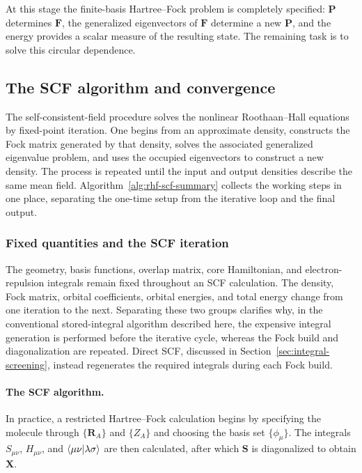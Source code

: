 \documentclass[11pt,a4paper,titlepage]{article}
\numberwithin{equation}{section}
\newcommand{\bF}{\boldsymbol{F}}
\newcommand{\bP}{\boldsymbol{P}}
\newcommand{\bR}{\boldsymbol{R}}
\newcommand{\bS}{\boldsymbol{S}}
\newcommand{\bX}{\boldsymbol{X}}
\begin{document}
At this stage the finite-basis Hartree--Fock problem is completely specified:
$\bP$ determines $\bF$, the generalized eigenvectors of $\bF$ determine a new
$\bP$, and the energy provides a scalar measure of the resulting state. The
remaining task is to solve this circular dependence.

\subsection{The SCF algorithm and convergence}

The self-consistent-field procedure solves the nonlinear
Roothaan--Hall equations by fixed-point iteration. One begins from an
approximate density, constructs the Fock matrix generated by that density,
solves the associated generalized eigenvalue problem, and uses the occupied
eigenvectors to construct a new density. The process is repeated until the
input and output densities describe the same mean field.
Algorithm~\ref{alg:rhf-scf-summary} collects the working steps in one place,
separating the one-time setup from the iterative loop and the final output.

\subsubsection{Fixed quantities and the SCF iteration}

The geometry, basis functions, overlap matrix, core Hamiltonian, and
electron-repulsion integrals remain fixed throughout an SCF calculation. The
density, Fock matrix, orbital coefficients, orbital energies, and total energy
change from one iteration to the next. Separating these two groups clarifies
why, in the conventional stored-integral algorithm described here, the
expensive integral generation is performed before the iterative cycle,
whereas the Fock build and diagonalization are repeated. Direct SCF, discussed
in Section~\ref{sec:integral-screening}, instead regenerates the required
integrals during each Fock build.

\paragraph{The SCF algorithm.}

In practice, a restricted Hartree--Fock calculation begins by
specifying the molecule through $\{\bR_A\}$ and $\{Z_A\}$ and choosing
the basis set $\{\phi_\mu\}$. The integrals $S_{\mu\nu}$,
$H_{\mu\nu}$, and $\braket{\mu\nu}{\lambda\sigma}$ are then calculated,
after which $\bS$ is diagonalized to obtain $\bX$.
\end{document}
